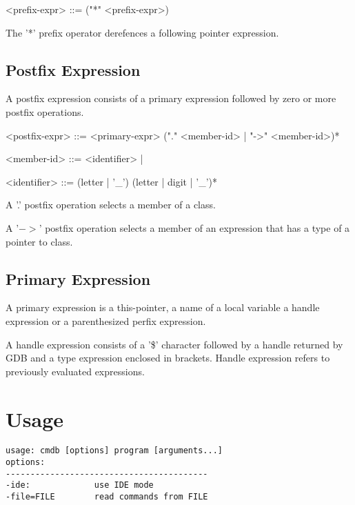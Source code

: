 \documentclass[oneside, a4paper, 11pt]{article}
\begin{document}
\begin{grammar}
<prefix-expr> ::= ("*" <prefix-expr>)
\end{grammar}

The '*' prefix operator derefences a following pointer expression.

\subsection{Postfix Expression}

A postfix expression consists of a primary expression followed by zero or more
postfix operations.

\begin{grammar}
<postfix-expr> ::= <primary-expr> ("." <member-id> | "->" <member-id>)*

<member-id> ::= <identifier> | 

<identifier> ::= (letter | '_') (letter | digit | '_')*
\end{grammar}

A '.' postfix operation selects a member of a class.

A '$->$' postfix operation selects a member of an expression that has a type of a pointer to class.

\subsection{Primary Expression}

A primary expression is a this-pointer, a name of a local variable a handle expression or a parenthesized perfix expression.

\begin{grammar}
<primary-expr> ::=  | <identifier> | "$" <int> <type-expr-part> | "(" <prefix-expr> ")"

<type-expr-part> ::= '[' (anychar - ']')+ ']'
\end{grammar}

A handle expression consists of a '\$' character followed by a handle returned by GDB
and a type expression enclosed in brackets. Handle expression refers to previously
evaluated expressions.

\section{Usage}

\begin{verbatim}
usage: cmdb [options] program [arguments...]
options:
-----------------------------------------
-ide:             use IDE mode
-file=FILE        read commands from FILE
\end{verbatim}
\end{document}
